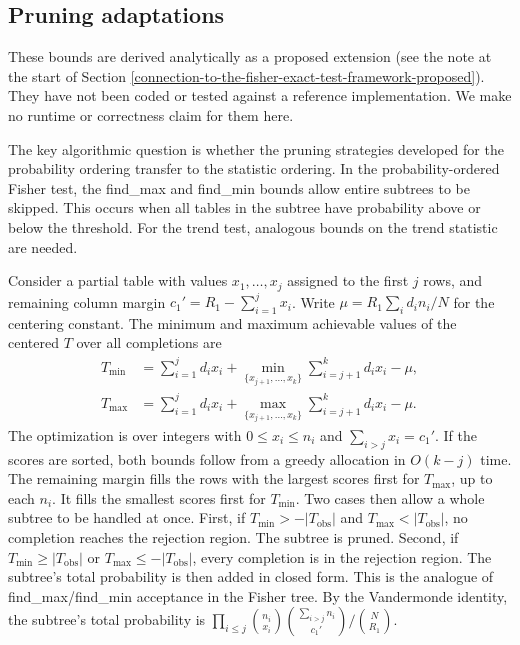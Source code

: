 \documentclass[
  11pt,
]{article}
\begin{document}
\subsection{Pruning adaptations}\label{pruning-adaptations}

These bounds are derived analytically as a proposed
extension (see the note at the start of Section
\ref{connection-to-the-fisher-exact-test-framework-proposed}).
They have not been coded or tested against a reference
implementation. We make no runtime or correctness claim
for them here.

The key algorithmic question is whether the pruning
strategies developed for the probability ordering
transfer to the statistic ordering. In the
probability-ordered Fisher test, the find\_max and
find\_min bounds allow entire subtrees to be skipped.
This occurs when all tables in the subtree have
probability above or below the threshold. For the trend
test, analogous bounds on the trend statistic are
needed.

Consider a partial table with values \(x_1, \ldots, x_j\)
assigned to the first \(j\) rows, and remaining column
margin \(c_1' = R_1 - \sum_{i=1}^{j} x_i\). Write
\(\mu = R_1 \sum_i d_i n_i / N\) for the centering constant.
The minimum and maximum achievable values of the centered
\(T\) over all completions are
\begin{align*}
T_{\min} &= \sum_{i=1}^{j} d_i x_i +
  \min_{\{x_{j+1},\ldots,x_k\}}
  \sum_{i=j+1}^{k} d_i x_i - \mu, \\
T_{\max} &= \sum_{i=1}^{j} d_i x_i +
  \max_{\{x_{j+1},\ldots,x_k\}}
  \sum_{i=j+1}^{k} d_i x_i - \mu.
\end{align*}
The optimization is over integers with
\(0 \leq x_i \leq n_i\) and \(\sum_{i>j} x_i = c_1'\). If the
scores are sorted, both bounds follow from a greedy
allocation in \(O(k-j)\) time. The remaining margin fills
the rows with the largest scores first for \(T_{\max}\), up
to each \(n_i\). It fills the smallest scores first for
\(T_{\min}\). Two cases then allow a whole subtree to be
handled at once. First, if
\(T_{\min} > -|T_{\text{obs}}|\) and
\(T_{\max} < |T_{\text{obs}}|\), no completion reaches the
rejection region. The subtree is pruned. Second, if
\(T_{\min} \geq |T_{\text{obs}}|\) or
\(T_{\max} \leq -|T_{\text{obs}}|\), every completion is in
the rejection region. The subtree's total probability is
then added in closed form. This is the analogue of
find\_max/find\_min acceptance in the Fisher tree. By the
Vandermonde identity, the subtree's total probability is
\(\prod_{i \leq j} \binom{n_i}{x_i}
\binom{\sum_{i>j} n_i}{c_1'} / \binom{N}{R_1}\).
\end{document}
